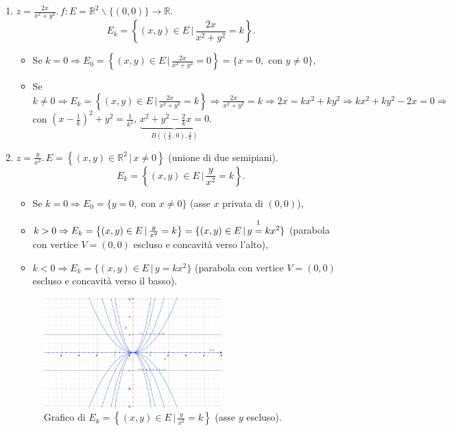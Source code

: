 \begin{example}
\begin{enumerate}
\begin{itemize}
\begin{figure}
            \end{figure}
        \end{itemize}
        \item $z=\frac{2x}{x^2+y^2}.\, f:E=\mathbb R^2\backslash\{(0,0)\}\rightarrow\mathbb R.$
        \begin{equation*}
            E_k=\left\{(x,y)\in E\,|\, \frac{2x}{x^2+y^2}=k\right\}.
        \end{equation*}
        \begin{itemize}
            \item Se $k=0\Rightarrow E_0=\left\{(x,y)\in E\,|\, \frac{2x}{x^2+y^2}=0\right\}=\{x=0, \text{ con } y\neq 0\},$
            \item Se $k\neq 0\Rightarrow E_k=\left\{(x,y)\in E\,|\, \frac{2x}{x^2+y^2}=k\right\}\Rightarrow\frac{2x}{x^2+y^2}=k\Rightarrow 2x=kx^2+ky^2\Rightarrow kx^2+ky^2-2x=0\Rightarrow$ con $\left(x-\frac{1}{k}\right)^2+y^2=\frac{1}{k^2 },\, \underbrace{x^2+y^2-\frac{2}{k}x=0}_{B\left(\left(\frac{1}{k},\, 0\right),\frac{1}{k}\right)}.$
        \end{itemize}
        \item $z=\frac{y}{x^2}.\, E=\left\{(x,y)\in\mathbb R^2\,|\, x\neq 0\right\}$ (unione di due semipiani).
        \begin{equation*}
            E_k=\left\{(x,y)\in E\,|\, \frac{y}{x^2}=k\right\}.
        \end{equation*}
        \begin{itemize}
            \item Se $k=0\Rightarrow E_0=\{y=0,\text{ con } x\neq 0\}$ (asse $x$ privata di $(0,0)$),
            \item $k>0 \Rightarrow E_k=\left\{(x,y)\in E\,|\, \frac{y}{x^2}=k\right\}=\{(x,y)\in E\,|\, y\overset{\footnotemark}{=}kx^2\}$ (parabola con vertice $V=(0,0)$ escluso e concavità verso l'alto),
            \item $k<0\Rightarrow E_k=\{(x,y)\in E\,|\, y=kx^2\}$ (parabola con vertice $V=(0,0)$ escluso e concavità verso il basso).
        \end{itemize}
        \begin{figure}
        \centering
        \includegraphics[width=0.65\textwidth]{Analisi2/figures/esempio_E_k.jpg}
            \caption{Grafico di $E_k=\left\{(x,y)\in E\,|\, \frac{y}{x^2}=k\right\}$ (asse $y$ escluso).}\label{fig:esempio_E_k}
        \end{figure}
    \end{enumerate}
\end{example}

